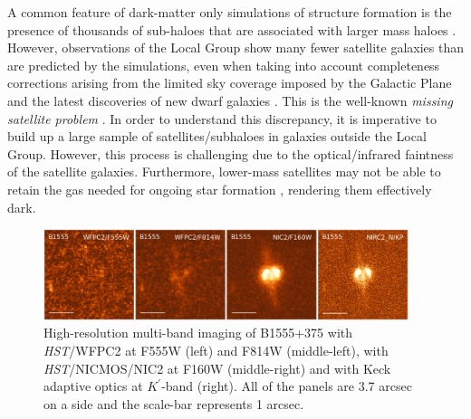 \documentclass[a4paper,fleqn,usenatbib,useAMS]{mnras}
\begin{document}
A common feature of dark-matter only simulations of structure formation is the presence of thousands of sub-haloes that are associated with larger mass haloes \citep[e.g.][]{Springel08}. However, observations of the Local Group show many fewer satellite galaxies than are predicted by the simulations, even when taking into account completeness corrections arising from the limited sky coverage imposed by the Galactic Plane and the latest discoveries of new dwarf galaxies \citep{DES15,Kop15}.  
This is the well-known {\it missing satellite problem} \citep{Klypin1999,Moore1999,S07}. In order to understand this discrepancy, it is imperative to build up a large sample of satellites/subhaloes in galaxies outside the Local Group. However, this process is challenging due to the optical/infrared faintness of the satellite galaxies.  Furthermore, lower-mass satellites may not be able to retain the gas needed for ongoing star formation \citep[e.g.][]{P11}, rendering them effectively dark.  

\begin{figure}
\includegraphics[width=0.95\textwidth]{B1555_gallery.eps}
\caption{High-resolution multi-band imaging of B1555+375 with {\it HST}/WFPC2 at F555W (left) and F814W (middle-left), with {\it HST}/NICMOS/NIC2 at F160W (middle-right) and with Keck adaptive optics at $K^\prime$-band (right). All of the panels are 3.7 arcsec on a side and the scale-bar represents 1 arcsec.}
\label{fig:multiband}
\end{figure}
\end{document}
